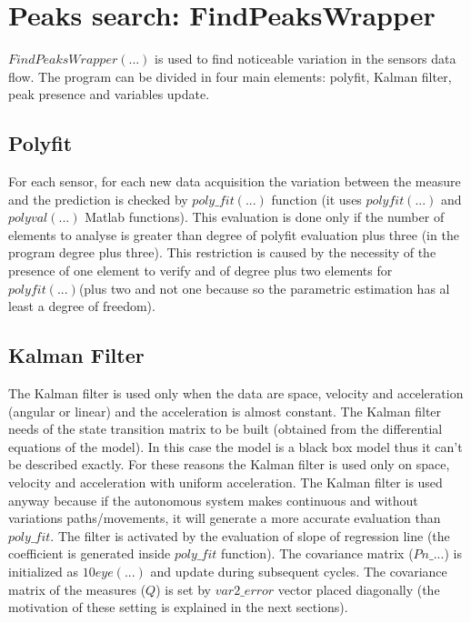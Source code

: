 \documentclass[journal]{IEEEtran}
\begin{document}
\section{Peaks search: FindPeaksWrapper}

$FindPeaksWrapper(...)$ is used to find noticeable variation in the sensors data flow.
The program can be divided in four main elements: polyfit, Kalman filter, peak presence
and variables update.

\subsection{Polyfit}
For each sensor, for each new data acquisition the variation between the measure and the prediction is checked by $poly\_fit(...)$ function (it uses $polyfit(...)$ and $polyval(...)$ Matlab functions). This evaluation is done only if the number of elements to analyse is greater than degree of polyfit evaluation plus three (in the program degree plus three). This restriction is caused by the necessity of the presence of one element to verify and of degree plus two elements for $polyfit(...)$(plus two and not one because so the parametric estimation has al least a degree of freedom).

\subsection{Kalman Filter}
The Kalman filter is used only when the data are space, velocity and acceleration (angular or linear) and the acceleration is almost constant.
The Kalman filter needs of the state transition matrix to be built (obtained from the differential equations of the model). In this case the model is a black box model thus it can't be described exactly. For these reasons the Kalman filter is used only on space, velocity and acceleration with uniform acceleration.
The Kalman filter is used anyway because if the autonomous system makes continuous and without variations paths/movements, it will generate a more accurate evaluation than $poly\_fit$.
The filter is activated by the evaluation of slope of regression line (the coefficient is generated inside $poly\_fit$ function).
The covariance matrix ($Pn\_...$) is initialized as $10$\hspace{1mm}$eye(...)$ and update during subsequent cycles.
The covariance matrix of the measures ($Q$) is set by $var2\_error$ vector placed diagonally (the motivation of these setting is explained in the next sections).
\end{document}
